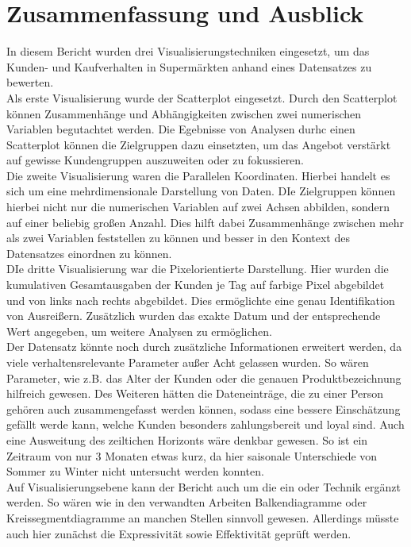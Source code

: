 \documentclass[usegeometry=true]{scrartcl}
\begin{document}
\section{Zusammenfassung und Ausblick}
In diesem Bericht wurden drei Visualisierungstechniken eingesetzt, um das Kunden- und Kaufverhalten in Supermärkten anhand eines Datensatzes zu bewerten.\\
Als erste Visualisierung wurde der Scatterplot eingesetzt. Durch den Scatterplot können Zusammenhänge und Abhängigkeiten zwischen zwei numerischen Variablen begutachtet werden.
Die Egebnisse von Analysen durhc einen Scatterplot können die Zielgruppen dazu einsetzten, um das Angebot verstärkt auf gewisse Kundengruppen auszuweiten oder zu fokussieren.\\
Die zweite Visualisierung waren die Parallelen Koordinaten. Hierbei handelt es sich um eine mehrdimensionale Darstellung von Daten. DIe Zielgruppen können hierbei nicht nur die
numerischen Variablen auf zwei Achsen abbilden, sondern auf einer beliebig großen Anzahl. Dies hilft dabei Zusammenhänge zwischen mehr als zwei Variablen feststellen zu können und
besser in den Kontext des Datensatzes einordnen zu können.\\
DIe dritte Visualisierung war die Pixelorientierte Darstellung. Hier wurden die kumulativen Gesamtausgaben der Kunden je Tag auf farbige Pixel abgebildet und von links nach rechts
abgebildet. Dies ermöglichte eine genau Identifikation von Ausreißern. Zusätzlich wurden das exakte Datum und der entsprechende Wert angegeben, um weitere Analysen zu ermöglichen.\\
\noindent Der Datensatz könnte noch durch zusätzliche Informationen erweitert werden, da viele verhaltensrelevante Parameter außer Acht gelassen wurden. So wären Parameter, wie
z.B. das Alter der Kunden oder die genauen Produktbezeichnung hilfreich gewesen. Des Weiteren hätten die Dateneinträge, die zu einer Person gehören auch zusammengefasst werden
können, sodass eine bessere Einschätzung gefällt werde kann, welche Kunden besonders zahlungsbereit und loyal sind. Auch eine Ausweitung des zeiltichen Horizonts wäre denkbar
gewesen. So ist ein Zeitraum von nur 3 Monaten etwas kurz, da hier saisonale Unterschiede von Sommer zu Winter nicht untersucht werden konnten.\\
Auf Visualisierungsebene kann der Bericht auch um die ein oder Technik ergänzt werden. So wären wie in den verwandten Arbeiten Balkendiagramme oder Kreissegmentdiagramme an manchen
Stellen sinnvoll gewesen. Allerdings müsste auch hier zunächst die Expressivität sowie Effektivität geprüft werden. 
\printbibliography
\end{document}

